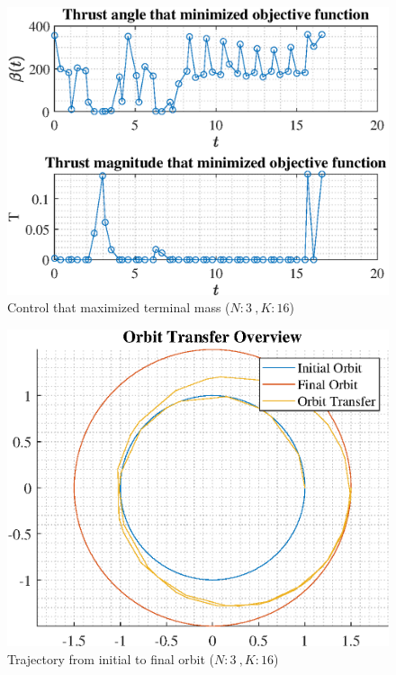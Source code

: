 \documentclass[]{article}
\begin{document}
\begin{figure}
	\centering
	\includegraphics[scale=0.75]{control_N3_K16_C2_mf.eps}
	\caption{Control that maximized terminal mass (\(N:3\ , K:16\))}
	\label{fig:control_N3_K16_C2_mf}
\end{figure}
\begin{figure}
	\centering
	\includegraphics[scale=0.75]{orbit_N3_K16_C2_mf.eps}
	\caption{Trajectory from initial to final orbit (\(N:3\ , K:16\))}
	\label{fig:orbit_N3_K16_C2_mf}
\end{figure}
\end{document}
